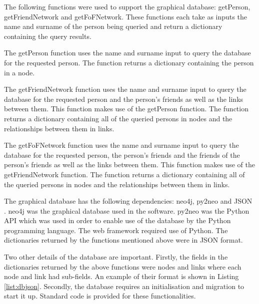 \documentclass[12pt,onecolumn]{article}
\begin{document}
	The following functions were used to support the graphical database: getPerson, getFriendNetwork and getFoFNetwork. These functions each take as inputs the name and surname of the person being queried and return a dictionary containing the query results. 
	
	The getPerson function uses the name and surname input to query the database for the requested person. The function returns a dictionary containing the person in a node.
	
	The getFriendNetwork function uses the name and surname input to query the database for the requested person and the person's friends as well as the links between them. This function makes use of the getPerson function. The function returns a dictionary containing all of the queried persons in nodes and the relationships between them in links.
	
	The getFoFNetwork function uses the name and surname input to query the database for the requested person, the person's friends and the friends of the person's friends as well as the links between them. This function makes use of the getFriendNetwork function. The function returns a dictionary containing all of the queried persons in nodes and the relationships between them in links.
	
	The graphical database has the following dependencies: neo4j, py2neo and JSON \cite{neo4j, py2neo, JSON}. neo4j was the graphical database used in the software. py2neo was the Python API which was used in order to enable use of the database by the Python programming language. The web framework required use of Python. The dictionaries returned by the functions mentioned above were in JSON format.
	
	Two other details of the database are important. Firstly, the fields in the dictionaries returned by the above functions were nodes and links where each node and link had sub-fields. An example of their format is shown in Listing \ref{list:dbjson}. Secondly, the database requires an initialisation and migration to start it up. Standard code is provided for these functionalities.
	
\end{document}
